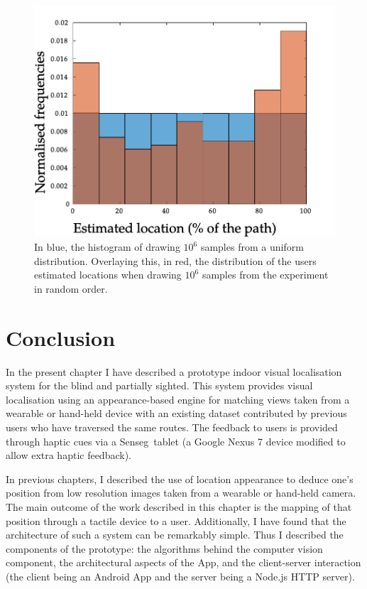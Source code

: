 \begin{figure}[h]
    \centering
    \includegraphics[width=.7\textwidth]{gfx/Chapter06/barplot_rand.pdf}%
    \caption{In blue, the histogram of drawing $10^6$ samples from a uniform distribution. Overlaying this, in red, the distribution of the users estimated locations when drawing $10^6$ samples from the experiment in random order.}   
\end{figure}


\section{Conclusion}
\label{sec:conclusion}


In the present chapter I have described a prototype indoor visual localisation system for the blind and partially sighted. This system provides visual localisation using an appearance-based engine for matching views taken from a wearable or hand-held device with an existing dataset contributed by previous users who have traversed the same routes. The feedback to users is provided through haptic cues via a Senseg\texttrademark\ tablet (a Google Nexus 7 device modified to allow extra haptic feedback).

In previous chapters, I described the use of location appearance to deduce one's position from low resolution images taken from a wearable or hand-held camera. The main outcome of the work described in this chapter is the mapping of that position through a tactile device to a user. Additionally, I have found that the architecture of such a system can be remarkably simple. Thus I described the components of the prototype: the algorithms behind the computer vision component, the architectural aspects of the App, and the client-server interaction (the client being an Android App and the server being a Node.js HTTP server).

